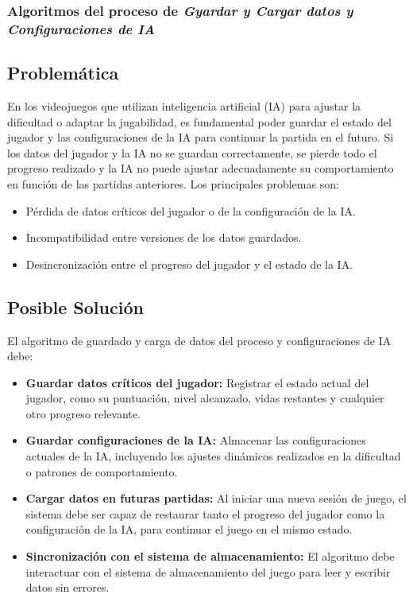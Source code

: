 \subsubsection{Algoritmos del proceso de \textit{Gyardar y Cargar datos y Configuraciones de IA}}

\subsection*{Problemática}
En los videojuegos que utilizan inteligencia artificial (IA) para ajustar la dificultad o adaptar la jugabilidad, es fundamental poder guardar el estado del jugador y las configuraciones de la IA para continuar la partida en el futuro. Si los datos del jugador y la IA no se guardan correctamente, se pierde todo el progreso realizado y la IA no puede ajustar adecuadamente su comportamiento en función de las partidas anteriores. Los principales problemas son:
\begin{itemize}
    \item Pérdida de datos críticos del jugador o de la configuración de la IA.
    \item Incompatibilidad entre versiones de los datos guardados.
    \item Desincronización entre el progreso del jugador y el estado de la IA.
\end{itemize}

\subsection*{Posible Solución}
El algoritmo de guardado y carga de datos del proceso y configuraciones de IA debe:
\begin{itemize}
    \item \textbf{Guardar datos críticos del jugador:} Registrar el estado actual del jugador, como su puntuación, nivel alcanzado, vidas restantes y cualquier otro progreso relevante.
    \item \textbf{Guardar configuraciones de la IA:} Almacenar las configuraciones actuales de la IA, incluyendo los ajustes dinámicos realizados en la dificultad o patrones de comportamiento.
    \item \textbf{Cargar datos en futuras partidas:} Al iniciar una nueva sesión de juego, el sistema debe ser capaz de restaurar tanto el progreso del jugador como la configuración de la IA, para continuar el juego en el mismo estado.
    \item \textbf{Sincronización con el sistema de almacenamiento:} El algoritmo debe interactuar con el sistema de almacenamiento del juego para leer y escribir datos sin errores.
\end{itemize}


